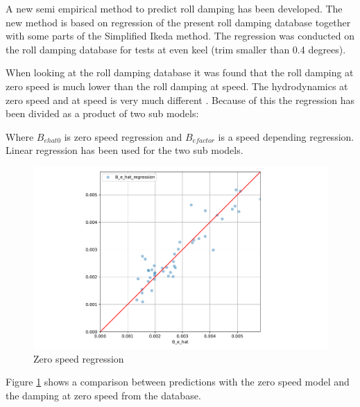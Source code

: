 A new semi empirical method to predict roll damping has been developed. The new method is based on regression of the present roll damping database together with some parts of the Simplified Ikeda method.  The regression was conducted on the roll damping database for tests at even keel (trim smaller than 0.4 degrees).

When looking at the roll damping database it was found that the roll damping at zero speed is much lower than the roll damping at speed. The hydrodynamics at zero speed and at speed is very much different \cite{ikeda_velocity_1979}. Because of this the regression has been divided as a product of two sub models:

Where $B_{ehat0}$ is zero speed regression and $B_{efactor}$ is a speed depending regression. Linear regression has been used for the two sub models. 

\begin{figure}[H]
    \centering
    \includegraphics[width=\columnwidth]{figures/B_e_hat0_regression.pdf}
    \caption{Zero speed regression}
    \label{fig:B_e_hat0_regression}
\end{figure}
Figure \ref{fig:B_e_hat0_regression} shows a comparison between predictions with the zero speed model and the damping at zero speed from the database.

